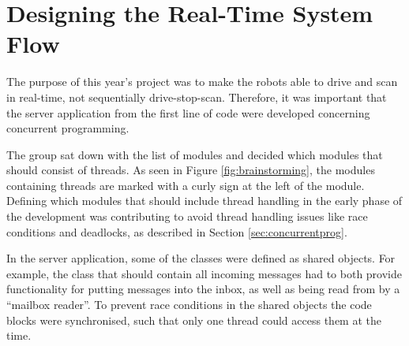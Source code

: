 \section{Designing the Real-Time System Flow}
The purpose of this year's project was to make the robots able to drive and scan in real-time, not sequentially drive-stop-scan. Therefore, it was important that the server application from the first line of code were developed concerning concurrent programming.

The group sat down with the list of modules and decided which modules that should consist of threads. As seen in Figure \ref{fig:brainstorming}, the modules containing threads are marked with a curly sign at the left of the module. Defining which modules that should include thread handling in the early phase of the development was contributing to avoid thread handling issues like race conditions and deadlocks, as described in Section \ref{sec:concurrentprog}.

In the server application, some of the classes were defined as shared objects. For example, the class that should contain all incoming messages had to both provide functionality for putting messages into the inbox, as well as being read from by a ``mailbox reader''. To prevent race conditions in the shared objects the code blocks were synchronised, such that only one thread could access them at the time. 

